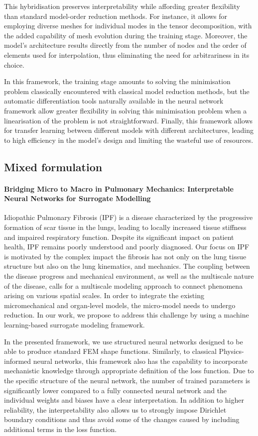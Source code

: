 This hybridisation preserves interpretability while affording greater flexibility than standard model-order reduction methods. For instance, it allows for employing diverse meshes for individual modes in the tensor decomposition, with the added capability of mesh evolution during the training stage. Moreover, the model's architecture results directly from the number of nodes and the order of elements used for interpolation, thus eliminating the need for arbitrariness in its choice.

In this framework, the training stage amounts to solving the minimisation problem classically encountered with classical model reduction methods, but the automatic differentiation tools naturally available in the neural network framework allow greater flexibility in solving this minimisation problem when a linearisation of the problem is not straightforward. 
Finally, this framework allows for transfer learning between different models with different architectures, leading to high efficiency in the model's design and limiting the wasteful use of resources.

\subsection{Mixed formulation}
\paragraph{Bridging Micro to Macro in Pulmonary Mechanics: Interpretable Neural Networks for Surrogate Modelling}
Idiopathic Pulmonary Fibrosis (IPF) is a disease characterized by the progressive formation of scar tissue in the lungs, leading to locally increased tissue stiffness and impaired respiratory function. Despite its significant impact on patient health, IPF remains poorly understood and poorly diagnosed. Our focus on IPF is motivated by the complex impact the fibrosis has not only on the lung tissue structure but also on the lung kinematics, and mechanics. The coupling between the disease progress and mechanical environment, as well as the multiscale nature of the disease, calls for a multiscale modeling approach to connect phenomena arising on various spatial scales. In order to integrate the existing micromechanical and organ-level models, the micro-model needs to undergo reduction. In our work, we propose to address this challenge by using a machine learning-based surrogate modeling framework.

In the presented framework, we use structured neural networks designed to be able to produce standard FEM shape functions. Similarly, to classical Physics-informed neural networks, this framework also has the capability to incorporate mechanistic knowledge through appropriate definition of the loss function. Due to the specific structure of the neural network, the number of trained parameters is significantly lower compared to a fully connected neural network and the individual weights and biases have a clear interpretation. In addition to higher reliability, the interpretability also allows us to strongly impose Dirichlet boundary conditions and thus avoid some of the changes caused by including additional terms in the loss function.

